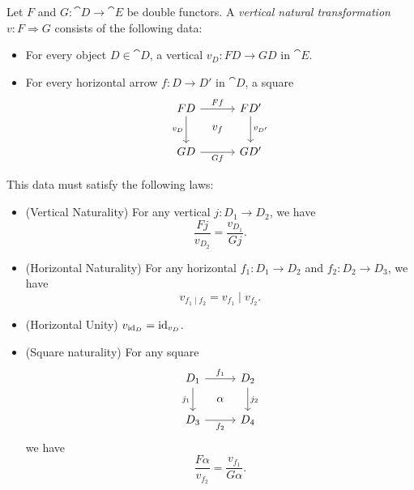 \documentclass[DynamicalBook]{subfiles}
\begin{document}
\begin{definition}\label{def.double_natural_transformation}
Let $F$ and $G : \cat{D} \to \cat{E}$ be double functors. A \emph{vertical
  natural transformation} $v : F \Rightarrow G$ consists of the following data:
\begin{itemize}
\item For every object $D \in \cat{D}$, a vertical $v_D : FD \to GD$ in $\cat{E}$.
\item For every horizontal arrow $f : D \to D'$ in $\cat{D}$, a square
\[
        \begin{tikzcd}[sep=tiny]
          FD \ar[dd, "v_D"'] \ar[rr, "Ff"] & & FD'
 \ar[dd, "v_{D'}"] \\
           & v_f & \\
          GD \ar[rr, "Gf"'] & & GD'
        \end{tikzcd}
\]
\end{itemize}
This data must satisfy the following laws:
\begin{itemize}
\item (Vertical Naturality) For any vertical $j : D_1 \to D_2$, we have 
$$\frac{Fj}{v_{D_2}} = \frac{v_{D_1}}{Gj}.$$
\item (Horizontal Naturality) For any horizontal $f_1 : D_1 \to D_2$ and $f_2 :
  D_2 \to D_3$, we have 
$$v_{f_1 \mid f_2} = v_{f_1} \mid v_{f_2}.$$
\item (Horizontal Unity) $v_{\mathrm{id}_D} = \mathrm{id}_{v_D}$. 
\item (Square naturality) For any square
\[
        \begin{tikzcd}[sep=tiny]
          D_1 \ar[dd, "j_1"'] \ar[rr, "f_1"] & & D_2
 \ar[dd, "j_2"] \\
           & \alpha & \\
          D_3 \ar[rr, "f_2"'] & & D_4
        \end{tikzcd}
\]
we have
$$\frac{F\alpha}{v_{f_2}} = \frac{v_{f_1}}{G\alpha}.$$
\end{itemize}


\end{definition}
\end{document}
